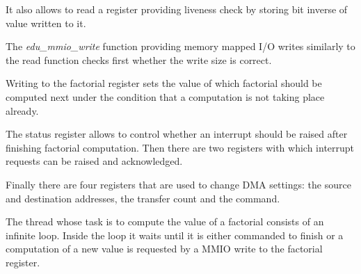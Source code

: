 \noindent
It also allows to read a register providing liveness check by storing bit inverse of value written to it.

\begin{codeblock}
    
\end{codeblock}

The \emph{edu\_mmio\_write} function providing memory mapped I/O writes
similarly to the read function checks first whether the write size is correct.

\begin{codeblock}
    
\end{codeblock}

\noindent
Writing to the factorial register sets the value of which factorial should be
computed next under the condition that a computation is not taking place
already.

\begin{codeblock}
    
\end{codeblock}

\noindent
The status register allows to control whether an interrupt should be raised
after finishing factorial computation. Then there are two registers with which
interrupt requests can be raised and acknowledged.

\begin{codeblock}
    
\end{codeblock}

\noindent
Finally there are four registers that are used to change DMA settings: the
source and destination addresses, the transfer count and the command.

\begin{codeblock}
    
\end{codeblock}

The thread whose task is to compute the value of a factorial consists of an
infinite loop. Inside the loop it waits until it is either commanded to finish
or a computation of a new value is requested by a MMIO write to the factorial
register.

